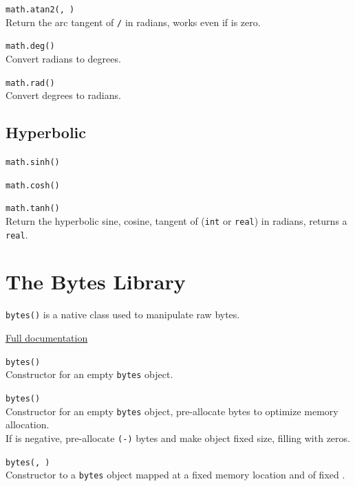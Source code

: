 \hangpar \texttt{math.atan2(}\texttt{, }\texttt{)}\\
Return the arc tangent of  \texttt{/}  in radians, works even if  is zero.

\hangpar \texttt{math.deg(}\texttt{)}\\
Convert radians to degrees.

\hangpar \texttt{math.rad(}\texttt{)}\\
Convert degrees to radians.

\subsection*{Hyperbolic}

\hangpar \texttt{math.sinh(}\texttt{)}

\hangpar \texttt{math.cosh(}\texttt{)}

\hangpar \texttt{math.tanh(}\texttt{)}\\
Return the hyperbolic sine, cosine, tangent of  (\texttt{int} or \texttt{real}) in radians, returns a \texttt{real}.

\section*{The Bytes Library}

\texttt{bytes()} is a native class used to manipulate raw bytes.

\hangpar \href{https://berry.readthedocs.io/en/latest/source/en/Chapter-7.html\#bytes-class}{Full documentation}

\hangpar \texttt{bytes()}\\
Constructor for an empty \texttt{bytes} object.

\hangpar \texttt{bytes(}\texttt{)}\\
Constructor for an empty \texttt{bytes} object, pre-allocate  bytes to optimize memory allocation.\\
If  is negative, pre-allocate \texttt{(-}\texttt{)} bytes and make object fixed size, filling with zeros.

\hangpar \texttt{bytes(}\texttt{, }\texttt{)}\\
Constructor to a \texttt{bytes} object mapped at a fixed memory location  and of fixed . 

